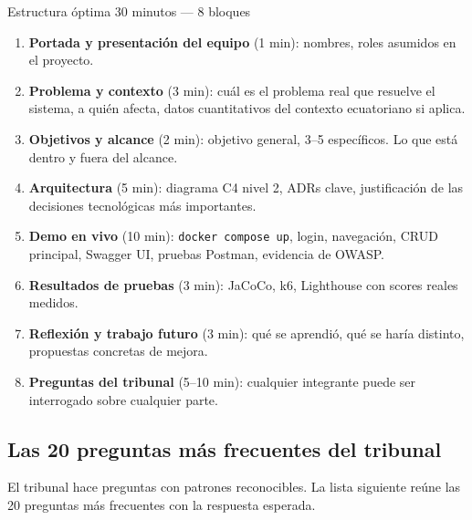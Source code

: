 \begin{cajadefinicion}{Estructura óptima 30 minutos --- 8 bloques}
\begin{enumerate}
\item \textbf{Portada y presentación del equipo} (1 min): nombres,
roles asumidos en el proyecto.
\item \textbf{Problema y contexto} (3 min): cuál es el problema real
que resuelve el sistema, a quién afecta, datos cuantitativos del
contexto ecuatoriano si aplica.
\item \textbf{Objetivos y alcance} (2 min): objetivo general, 3--5
específicos. Lo que está dentro y fuera del alcance.
\item \textbf{Arquitectura} (5 min): diagrama C4 nivel 2, ADRs
clave, justificación de las decisiones tecnológicas más importantes.
\item \textbf{Demo en vivo} (10 min): \texttt{docker compose up},
login, navegación, CRUD principal, Swagger UI, pruebas Postman,
evidencia de OWASP.
\item \textbf{Resultados de pruebas} (3 min): JaCoCo, k6, Lighthouse
con scores reales medidos.
\item \textbf{Reflexión y trabajo futuro} (3 min): qué se aprendió,
qué se haría distinto, propuestas concretas de mejora.
\item \textbf{Preguntas del tribunal} (5--10 min): cualquier integrante
puede ser interrogado sobre cualquier parte.
\end{enumerate}
\end{cajadefinicion}

\subsection{Las 20 preguntas más frecuentes del tribunal}

El tribunal hace preguntas con patrones reconocibles. La
lista siguiente reúne las 20 preguntas más frecuentes con la
respuesta esperada.


